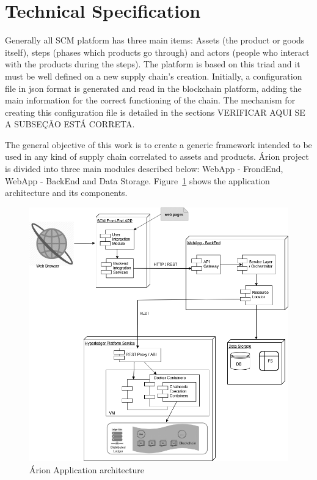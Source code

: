 \section{Technical Specification} \label{sec:Technical}

Generally all SCM platform has three main items: Assets (the product or goods itself), steps (phases which products go through) and actors (people who interact with the products during the steps). The platform is based on this triad and it must be well defined on a new supply chain's creation. Initially, a configuration file in json format is generated and read in the blockchain platform, adding the main information for the correct functioning of the chain. The mechanism for creating this configuration file is detailed in the sections  {\color{red} VERIFICAR AQUI SE A SUBSEÇÃO ESTÁ CORRETA}.

The general objective of this work is to create a generic framework intended to be used in any kind of supply chain correlated to assets and products. Árion project is divided into three main modules described below: WebApp - FrondEnd, WebApp - BackEnd and Data Storage. Figure~\ref{fig:detalhamentotecnico} shows the application architecture and its components.

\begin{figure}[ht]
\begin{center}
  \includegraphics[scale=0.45]{images/detalhamentotecnico.png}
\caption{Árion Application architecture}
\label{fig:detalhamentotecnico}
\end{center}
\end{figure}


